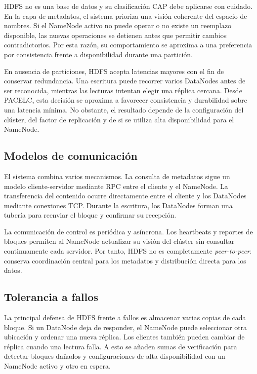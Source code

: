 \documentclass[12pt,a4paper]{article}
\begin{document}
HDFS no es una base de datos y su clasificación CAP debe aplicarse con cuidado. En la capa de metadatos, el sistema prioriza una visión coherente del espacio de nombres. Si el NameNode activo no puede operar o no existe un reemplazo disponible, las nuevas operaciones se detienen antes que permitir cambios contradictorios. Por esta razón, su comportamiento se aproxima a una preferencia por consistencia frente a disponibilidad durante una partición.

En ausencia de particiones, HDFS acepta latencias mayores con el fin de conservar redundancia. Una escritura puede recorrer varios DataNodes antes de ser reconocida, mientras las lecturas intentan elegir una réplica cercana. Desde PACELC, esta decisión se aproxima a favorecer consistencia y durabilidad sobre una latencia mínima. No obstante, el resultado depende de la configuración del clúster, del factor de replicación y de si se utiliza alta disponibilidad para el NameNode.

\subsection{Modelos de comunicación}

El sistema combina varios mecanismos. La consulta de metadatos sigue un modelo cliente-servidor mediante RPC entre el cliente y el NameNode. La transferencia del contenido ocurre directamente entre el cliente y los DataNodes mediante conexiones TCP. Durante la escritura, los DataNodes forman una tubería para reenviar el bloque y confirmar su recepción.

La comunicación de control es periódica y asíncrona. Los heartbeats y reportes de bloques permiten al NameNode actualizar su visión del clúster sin consultar continuamente cada servidor. Por tanto, HDFS no es completamente \textit{peer-to-peer}: conserva coordinación central para los metadatos y distribución directa para los datos.

\subsection{Tolerancia a fallos}

La principal defensa de HDFS frente a fallos es almacenar varias copias de cada bloque. Si un DataNode deja de responder, el NameNode puede seleccionar otra ubicación y ordenar una nueva réplica. Los clientes también pueden cambiar de réplica cuando una lectura falla. A esto se añaden sumas de verificación para detectar bloques dañados y configuraciones de alta disponibilidad con un NameNode activo y otro en espera.
\end{document}
